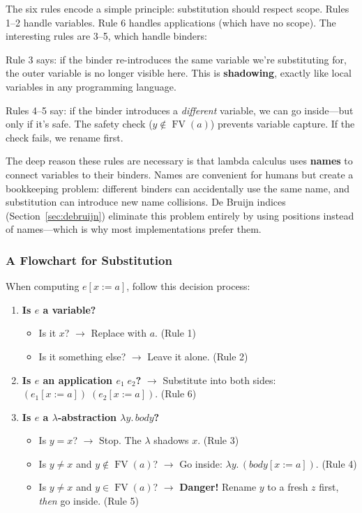 \documentclass[11pt,a4paper]{article}
\theoremstyle{definition}
\newcommand{\lam}{\lambda}
\newcommand{\FV}{\operatorname{FV}}
\begin{document}
\begin{intuition}
The six rules encode a simple principle: substitution should respect scope.
Rules 1--2 handle variables. Rule 6 handles applications (which have no scope).
The interesting rules are 3--5, which handle binders:

Rule 3 says: if the binder re-introduces the same variable we're substituting
for, the outer variable is no longer visible here. This is \textbf{shadowing},
exactly like local variables in any programming language.

Rules 4--5 say: if the binder introduces a \emph{different} variable, we can
go inside---but only if it's safe. The safety check ($y \notin \FV(a)$) prevents
variable capture. If the check fails, we rename first.

The deep reason these rules are necessary is that lambda calculus uses
\textbf{names} to connect variables to their binders. Names are convenient for
humans but create a bookkeeping problem: different binders can accidentally use
the same name, and substitution can introduce new name collisions. De Bruijn
indices (Section~\ref{sec:debruijn}) eliminate this problem entirely by using
positions instead of names---which is why most implementations prefer them.
\end{intuition}

\subsubsection{A Flowchart for Substitution}

When computing $e[x := a]$, follow this decision process:

\begin{enumerate}[leftmargin=2em]
\item \textbf{Is $e$ a variable?}
  \begin{itemize}
  \item Is it $x$? $\longrightarrow$ Replace with $a$. \hfill(Rule 1)
  \item Is it something else? $\longrightarrow$ Leave it alone. \hfill(Rule 2)
  \end{itemize}
\item \textbf{Is $e$ an application $e_1\;e_2$?}
  $\longrightarrow$ Substitute into both sides: $(e_1[x:=a])\;(e_2[x:=a])$.
  \hfill(Rule 6)
\item \textbf{Is $e$ a $\lam$-abstraction $\lam y.\, \mathit{body}$?}
  \begin{itemize}
  \item Is $y = x$? $\longrightarrow$ Stop. The $\lam$ shadows $x$. \hfill(Rule 3)
  \item Is $y \neq x$ and $y \notin \FV(a)$?
    $\longrightarrow$ Go inside: $\lam y.\, (\mathit{body}[x := a])$.
    \hfill(Rule 4)
  \item Is $y \neq x$ and $y \in \FV(a)$?
    $\longrightarrow$ \textbf{Danger!} Rename $y$ to a fresh $z$ first,
    \emph{then} go inside. \hfill(Rule 5)
  \end{itemize}
\end{enumerate}
\end{document}
